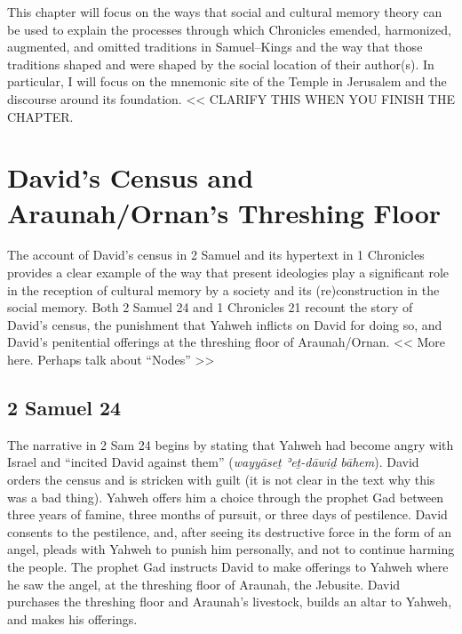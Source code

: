 This chapter will focus on the ways that social and cultural memory
theory can be used to explain the processes through which Chronicles
emended, harmonized, augmented, and omitted traditions in Samuel--Kings
and the way that those traditions shaped and were shaped by the social
location of their author(s). In particular, I will focus on the mnemonic
site of the Temple in Jerusalem and the discourse around its foundation.
\textless{}\textless{} CLARIFY THIS WHEN YOU FINISH THE CHAPTER.

\section{David's Census and Araunah/Ornan's Threshing
Floor}\label{davids-census-and-araunahornans-threshing-floor}

The account of David's census in 2 Samuel and its hypertext in 1
Chronicles provides a clear example of the way that present ideologies
play a significant role in the reception of cultural memory by a society
and its (re)construction in the social memory. Both 2 Samuel 24 and 1
Chronicles 21 recount the story of David's census, the punishment that
Yahweh inflicts on David for doing so, and David's penitential offerings
at the threshing floor of Araunah/Ornan. \textless{}\textless{} More
here. Perhaps talk about ``Nodes'' \textgreater{}\textgreater{}

\subsection{2 Samuel 24}\label{samuel-24}

The narrative in 2 Sam 24 begins by stating that Yahweh had become angry
with Israel and ``incited David against them'' (\emph{wayyāseṯ ʾeṯ-dāwiḏ
bāhem}). David orders the census and is stricken with guilt (it is not
clear in the text why this was a bad thing). Yahweh offers him a choice
through the prophet Gad between three years of famine, three months of
pursuit, or three days of pestilence. David consents to the pestilence,
and, after seeing its destructive force in the form of an angel, pleads
with Yahweh to punish him personally, and not to continue harming the
people. The prophet Gad instructs David to make offerings to Yahweh
where he saw the angel, at the threshing floor of Araunah, the Jebusite.
David purchases the threshing floor and Araunah's livestock, builds an
altar to Yahweh, and makes his offerings.

